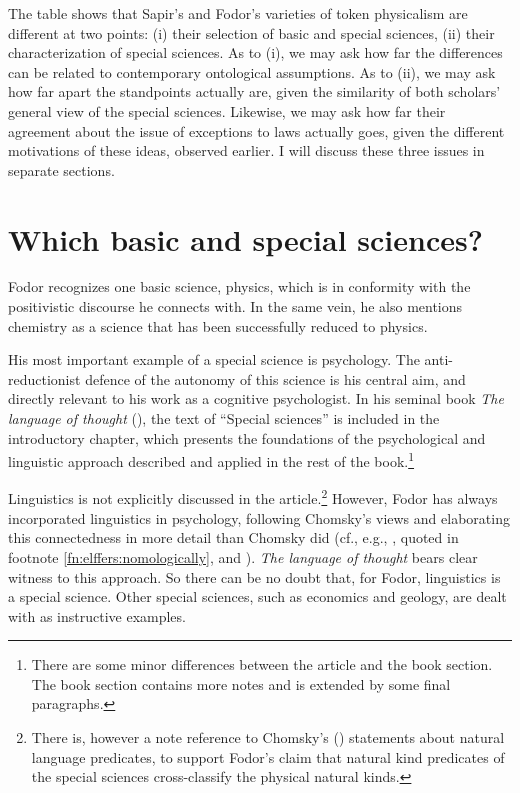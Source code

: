 \documentclass[output=paper]{langscibook}
\begin{document}
The table shows that Sapir's and Fodor's varieties of token physicalism are different at two points: (i) their selection of basic and special sciences, (ii) their characterization of special sciences. As to (i), we may ask how far the differences can be related to contemporary ontological assumptions. As to (ii), we may ask how far apart the standpoints actually are, given the similarity of both scholars' general view of the special sciences. Likewise, we may ask how far their agreement about the issue of exceptions to laws actually goes, given the different motivations of these ideas, observed earlier. I will discuss these three issues in separate sections.

\section{Which basic and special sciences?}
\label{sec:elffers:basicspecial}

Fodor recognizes one basic science, physics, which is in conformity with the positivistic discourse he connects with. In the same vein, he also mentions chemistry as a science that has been successfully reduced to physics.

His most important example of a special science is psychology. The anti-reductionist defence of the autonomy of this science is his central aim, and directly relevant to his work as a cognitive psychologist. In his seminal book \emph{The language of thought} (\citeyear{Fodor1975}), the text of ``Special sciences'' is included in the introductory chapter, which presents the foundations of the psychological and linguistic approach described and applied in the rest of the book.\footnote{There are some minor differences between the article and the book section. The book section contains more notes and is extended by some final paragraphs.}

Linguistics is not explicitly discussed in the \citeyear{Fodor1974} article.\footnote{There is, however a note reference to Chomsky's (\citeyear{Chomsky1965}) statements about natural language predicates, to support Fodor's claim that natural kind predicates of the special sciences cross-classify the physical natural kinds.} However, Fodor has always incorporated linguistics in psychology, following Chomsky's views and elaborating this connectedness in more detail than Chomsky did (cf., e.g., \citealt[149]{Fodor1985}, quoted in footnote \ref{fn:elffers:nomologically}, and \citealt[278]{LoewerRey1991}). \emph{The language of thought} bears clear witness to this approach. So there can be no doubt that, for Fodor, linguistics is a special science. Other special sciences, such as economics and geology, are dealt with as instructive examples.
\end{document}
